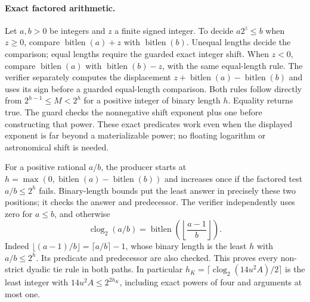 \documentclass[11pt]{article}
\theoremstyle{plain}
\theoremstyle{definition}
\theoremstyle{remark}
\begin{document}
\paragraph{Exact factored arithmetic.}
Let $a,b>0$ be integers and $z$ a finite signed integer. To decide
$a2^z\le b$ when $z\ge0$, compare
$\operatorname{bitlen}(a)+z$ with $\operatorname{bitlen}(b)$.
Unequal lengths decide the comparison; equal lengths require the guarded
exact integer shift. When $z<0$, compare $\operatorname{bitlen}(a)$ with
$\operatorname{bitlen}(b)-z$, with the same equal-length rule.
The verifier separately computes the displacement
$z+\operatorname{bitlen}(a)-\operatorname{bitlen}(b)$ and uses its sign
before a guarded equal-length comparison. Both rules follow directly from
$2^{h-1}\le M<2^h$ for a positive integer of binary length $h$.
Equality returns true. The guard checks the nonnegative shift exponent plus
one before constructing that power. These exact predicates work even when
the displayed exponent is far beyond a materializable power; no floating
logarithm or astronomical shift is needed.

For a positive rational $a/b$, the producer starts at
$h=\max(0,\operatorname{bitlen}(a)-\operatorname{bitlen}(b))$ and increases
once if the factored test $a/b\le2^h$ fails. Binary-length bounds put the
least answer in precisely these two positions; it checks the answer and
predecessor. The verifier independently uses zero for $a\le b$, and otherwise
\begin{equation}\label{udc:clog}
 \operatorname{clog}_2(a/b)
 =\operatorname{bitlen}\!\left(\left\lfloor\frac{a-1}{b}\right\rfloor\right).
\end{equation}
Indeed $\lfloor(a-1)/b\rfloor=\lceil a/b\rceil-1$, whose binary length is
the least $h$ with $a/b\le2^h$. Its predicate and predecessor are also
checked. This proves every non-strict dyadic tie rule in both paths.
In particular $h_K=\lceil\operatorname{clog}_2(14u^2A)/2\rceil$ is the
least integer with $14u^2A\le2^{2h_K}$, including exact powers of four and
arguments at most one.

\end{document}
